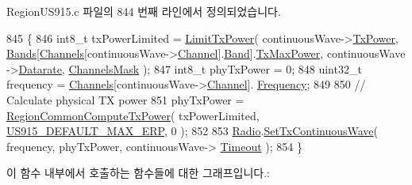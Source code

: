 Region\+U\+S915.\+c 파일의 844 번째 라인에서 정의되었습니다.


\begin{DoxyCode}
845 \{
846     int8\_t txPowerLimited = \mbox{\hyperlink{_region_u_s915_8c_af2821991c6e6dad3e196b01f6cf1d542}{LimitTxPower}}( continuousWave->\mbox{\hyperlink{structs_continuous_wave_params_a037b4f849fa8ed4aa1d3c58aef2b28ec}{TxPower}}, 
      \mbox{\hyperlink{_region_u_s915_8c_a04e3e1a4af677cf4f4b64c1335e07dd0}{Bands}}[\mbox{\hyperlink{_region_u_s915_8c_a83f8d040b2c69b3b4ed9ff970b0efcfb}{Channels}}[continuousWave->\mbox{\hyperlink{structs_continuous_wave_params_a1ca6f01ca18afe402de51babe8c95f5e}{Channel}}].\mbox{\hyperlink{structs_channel_params_a724c03aa06953111c3291243831f251b}{Band}}].\mbox{\hyperlink{structs_band_a1b9d27384fedab3a94167b8e9bf9b432}{TxMaxPower}}, continuousWave
      ->\mbox{\hyperlink{structs_continuous_wave_params_ae2f6080f3aa0e9485c55513ca56bb24d}{Datarate}}, \mbox{\hyperlink{_region_u_s915_8c_a2188957b5ca6af8092154d7ccbfa5757}{ChannelsMask}} );
847     int8\_t phyTxPower = 0;
848     uint32\_t frequency = \mbox{\hyperlink{_region_u_s915_8c_a83f8d040b2c69b3b4ed9ff970b0efcfb}{Channels}}[continuousWave->\mbox{\hyperlink{structs_continuous_wave_params_a1ca6f01ca18afe402de51babe8c95f5e}{Channel}}].
      \mbox{\hyperlink{structs_channel_params_ade3d190636488dad9a89b19446b7acf1}{Frequency}};
849 
850     \textcolor{comment}{// Calculate physical TX power}
851     phyTxPower = \mbox{\hyperlink{group___r_e_g_i_o_n_c_o_m_m_o_n_gaa92800c8e9ce21366d383d14878cc391}{RegionCommonComputeTxPower}}( txPowerLimited, 
      \mbox{\hyperlink{group___r_e_g_i_o_n_u_s915_gaf7ef0a7e48f12d53dc02e371cd136934}{US915\_DEFAULT\_MAX\_ERP}}, 0 );
852 
853     \mbox{\hyperlink{sx1276mb1las_8c_acf9fe61a72c16fa29a0dc449d23e3820}{Radio}}.\mbox{\hyperlink{struct_radio__s_a33dccb0bc830d9a68ec0c2e75b74e541}{SetTxContinuousWave}}( frequency, phyTxPower, continuousWave->
      \mbox{\hyperlink{structs_continuous_wave_params_ae1c58f120c7eef7bb71a5e3bfeaeb795}{Timeout}} );
854 \}
\end{DoxyCode}
이 함수 내부에서 호출하는 함수들에 대한 그래프입니다.\+:
\mbox{\label{group___r_e_g_i_o_n_u_s915_ga6343e63ddd0e281369b5741319fecc58}} 
